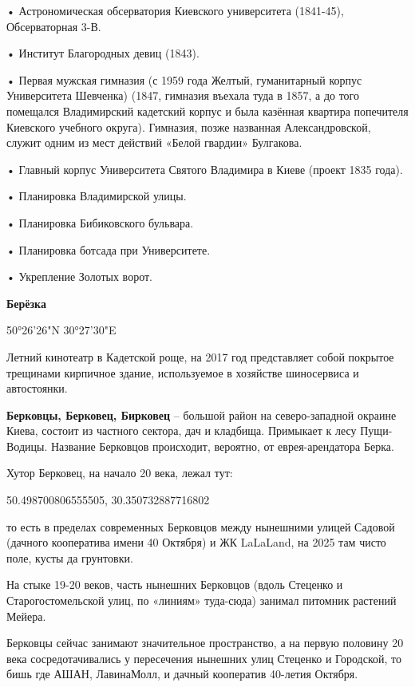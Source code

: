 \noindent • Астрономическая обсерватория Киевского университета (1841-45), Обсерваторная 3-В. 

\noindent • Институт Благородных девиц  (1843).

\noindent • Первая мужская гимназия (с 1959 года Желтый, гуманитарный корпус Университета Шевченка) (1847, гимназия въехала туда в 1857, а до того помещался Владимирский кадетский корпус и была казённая квартира попечителя Киевского учебного округа). Гимназия, позже названная Александровской, служит одним из мест действий «Белой гвардии» Булгакова.

\noindent • Главный корпус Университета Святого Владимира в Киеве (проект 1835 года).

\noindent • Планировка Владимирской улицы. 

\noindent • Планировка Бибиковского бульвара.

\noindent • Планировка ботсада при Университете.


\noindent • Укрепление Золотых ворот.\\

\medskip

\textbf{Берёзка} 

50°26'26"N 30°27'30"E

Летний кинотеатр в Кадетской роще, на 2017 год представляет собой покрытое трещинами кирпичное здание, используемое в хозяйстве шиносервиса и автостоянки.\\

\medskip

\textbf{Берковцы, Берковец, Бирковец} – большой район на северо-западной окраине Киева, состоит из частного сектора, дач и кладбища. Примыкает к лесу Пущи-Водицы. Название Берковцов происходит, вероятно, от еврея-арендатора Берка.

Хутор Берковец, на начало 20 века, лежал тут:

50.498700806555505, 30.350732887716802

то есть в пределах современных Берковцов между нынешними улицей Садовой (дачного кооператива имени 40 Октября) и ЖК LaLaLand, на 2025 там чисто поле, кусты да грунтовки.

На стыке 19-20 веков, часть нынешних Берковцов (вдоль Стеценко и Старогостомельской улиц, по «линиям» туда-сюда) занимал питомник растений Мейера.

Берковцы сейчас занимают значительное пространство, а на первую половину 20 века сосредотачивались у пересечения нынешних улиц Стеценко и Городской, то бишь где АШАН, ЛавинаМолл, и дачный кооператив 40-летия Октября.

